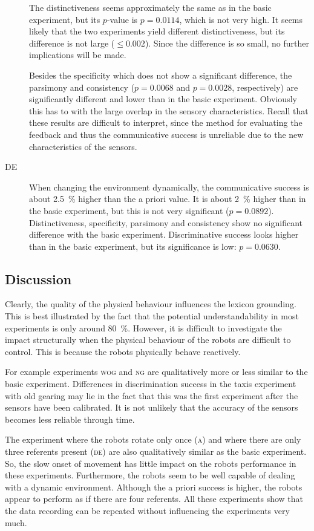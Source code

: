 \begin{description}
The distinctiveness seems approximately the same as in the basic experiment, but its $p$-value is $p=0.0114$, which is not very high. It seems likely that the two experiments yield different distinctiveness, but its difference is not large ($\leq 0.002$). Since the difference is so small, no further implications will be made.

Besides the specificity which does not show a significant difference, the parsimony and consistency ($p=0.0068$ and $p=0.0028$, respectively) are significantly different and lower than in the basic experiment. Obviously this has to with the large overlap in the sensory characteristics. Recall that these results are difficult to interpret, since the method for evaluating the feedback and thus the communicative success is unreliable due to the new characteristics of the sensors.

\item[DE] When changing the environment dynamically, the communicative success is about 2.5~\% higher than the a priori value. It is about 2~\% higher than in the basic experiment, but this is not very significant ($p=0.0892$). Distinctiveness, specificity, parsimony and consistency show no significant difference with the basic experiment. Discriminative success looks higher than in the basic experiment, but its significance is low: $p=0.0630$.
\end{description}

\subsection{Discussion}

Clearly, the quality of the physical behaviour influences the lexicon grounding. This is best illustrated by the fact that the potential understandability in most experiments is only around 80~\%. However, it is difficult to investigate the impact structurally when the physical behaviour of the robots are difficult to control. This is because the robots physically behave reactively.

For example experiments {\scshape wog} and {\scshape ng} are qualitatively more or less similar to the basic experiment. Differences in discrimination success in the taxis experiment with old gearing may lie in the fact that this was the first experiment after the sensors have been calibrated. It is not unlikely that the accuracy of the sensors becomes less reliable through time. 

The experiment where the robots rotate only once {\scshape (a)} and where there are only three referents present {\scshape (de)} are also qualitatively similar as the basic experiment. So, the slow onset of movement has little impact on the robots performance in these experiments. Furthermore, the robots seem to be well capable of dealing with a dynamic environment. Although the a priori success is higher, the robots appear to perform as if there are four referents. All these experiments show that the data recording can be repeated without influencing the experiments very much.

